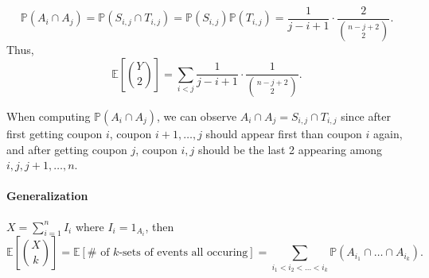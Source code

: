 \begin{eg}
    \[
        \mathbb{P} (A_i \cap A_j) = \mathbb{P} (S_{i, j} \cap T_{i, j}) = \mathbb{P} (S_{i, j}) \mathbb{P} (T_{i, j}) = \frac{1}{j - i + 1} \cdot \frac{2}{\binom{n - j + 2}{2}}.
    \]  
    Thus, 
    \[
        \mathbb{E} \left[ \binom{Y}{2} \right] = \sum_{i < j} \frac{1}{j - i + 1} \cdot \frac{1}{\binom{n - j + 2}{2}}.  
    \]
    \begin{remark}
        When computing \(\mathbb{P} (A_i \cap A_j)\), we can observe \(A_i \cap A_j = S_{i, j} \cap T_{i, j}\) since after first getting coupon \(i\), coupon \(i+1, \dots , j\) should appear first than coupon \(i\) again, and after getting coupon \(j\), coupon \(i, j\) should be the last 2 appearing among \(i, j, j+1, \dots , n\).         
    \end{remark}
\end{eg}

\paragraph{Generalization} \(X = \sum_{i=1}^n I_i \) where \(I_i = 1_{A_i}\), then 
\[
    \mathbb{E} \left[ \binom{X}{k} \right] = \mathbb{E} \left[ \# \text{ of } k\text{-sets of events all occuring}   \right] = \sum_{i_1 < i_2 < \dots < i_k} \mathbb{P} (A_{i_1} \cap \dots \cap A_{i_k}).  
\]  